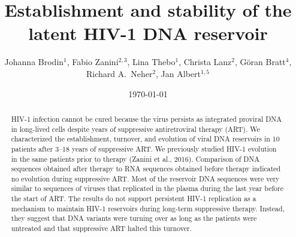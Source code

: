 \documentclass[aps,rmp,onecolumn,linenumbers]{revtex4-1}
\begin{document}
\title{Establishment and stability of the latent HIV-1 DNA reservoir}
\author{Johanna Brodin$^{1}$, Fabio Zanini$^{2,3}$, Lina Thebo$^{1}$, Christa Lanz$^{2}$, G\"oran Bratt$^4$, Richard A.~Neher$^{2}$, Jan Albert$^{1,5}$}
\date{\today}

\begin{abstract}
HIV-1 infection cannot be cured because the virus persists as integrated proviral DNA in long-lived cells despite years of suppressive antiretroviral therapy (ART). We characterized the establishment, turnover, and evolution of viral DNA reservoirs in 10 patients after 3--18 years of suppressive ART. We previously studied HIV-1 evolution in the same patients prior to therapy (Zanini et al., 2016). Comparison of DNA sequences obtained after therapy to RNA sequences obtained before therapy indicated no evolution during suppressive ART. Most of the reservoir DNA sequences were very similar to sequences of viruses that replicated in the plasma during the last year before the start of ART. The results do not support persistent HIV-1 replication as a mechanism to maintain HIV-1 reservoirs during long-term suppressive therapy. Instead, they suggest that DNA variants were turning over as long as the patients were untreated and that suppressive ART halted this turnover.
\end{abstract}

\maketitle
\end{document}
